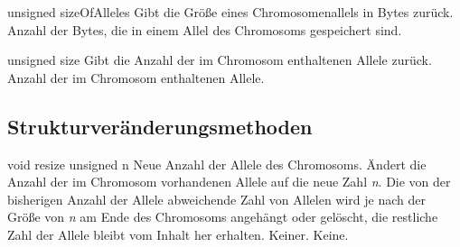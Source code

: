 \documentclass{report}
\begin{document}
\vspace{4ex}

    \printEmptyMethodReturn
    {unsigned} 
    {sizeOfAlleles}
    {Gibt die Gr\"o{\ss}e eines Chromosomenallels in Bytes zur\"uck.}
    {Anzahl der Bytes, die in einem Allel des Chromosoms gespeichert sind.}

\vspace{2ex}

    \printEmptyMethodReturn
    {unsigned} 
    {size}
    {Gibt die Anzahl der im Chromosom enthaltenen Allele zur\"uck.}
    {Anzahl der im Chromosom enthaltenen Allele.}

\subsection{Strukturver\"anderungsmethoden}


    \setNormalInstance
    \printMethodWithOneParam
    {void} 
    {resize}
    {unsigned} 
    {n} 
    {Neue Anzahl der Allele des Chromosoms.}
    {\"Andert die Anzahl der im Chromosom vorhandenen Allele auf die neue 
     Zahl {\em n}. Die von der bisherigen Anzahl der Allele abweichende Zahl 
     von Allelen wird je nach der Gr\"o{\ss}e von {\em n} am Ende des 
     Chromosoms angeh\"angt oder gel\"oscht, die restliche Zahl der Allele 
     bleibt vom Inhalt her erhalten.}
    {Keiner.}
    {Keine.}

\vspace{4ex}
\end{document}
